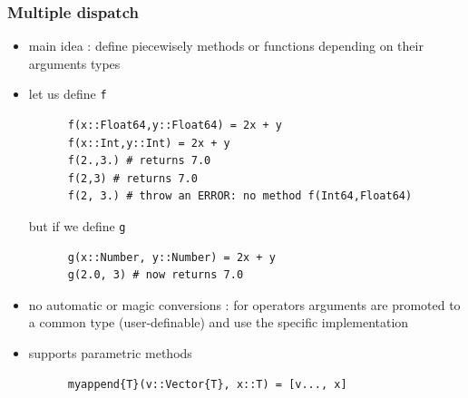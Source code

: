 \documentclass[11pt,mathserif]{beamer}
\begin{document}

\begin{frame}[fragile]
  \frametitle{Multiple dispatch}
  \begin{itemize}
    \pause
    \item main idea : define piecewisely methods or functions depending on their arguments types
    \pause
    \item let us define \texttt{f}
    \begin{lstlisting}
      f(x::Float64,y::Float64) = 2x + y
      f(x::Int,y::Int) = 2x + y
      f(2.,3.) # returns 7.0
      f(2,3) # returns 7.0
      f(2, 3.) # throw an ERROR: no method f(Int64,Float64)
    \end{lstlisting}
    \pause
    but if we define \texttt{g}
    \begin{lstlisting}
      g(x::Number, y::Number) = 2x + y
      g(2.0, 3) # now returns 7.0
    \end{lstlisting}
    \pause
    \item no automatic or magic conversions : for operators 
    arguments are promoted to a common type (user-definable) and
    use the specific implementation
    \pause
    \item supports parametric methods
    \begin{lstlisting}
      myappend{T}(v::Vector{T}, x::T) = [v..., x] 
    \end{lstlisting}
  \end{itemize}
\end{frame}

\end{document}
